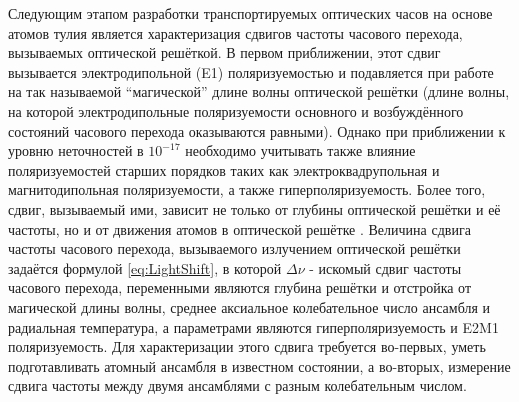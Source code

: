 Следующим этапом разработки транспортируемых оптических часов на основе атомов тулия является характеризация сдвигов частоты часового перехода, вызываемых оптической решёткой.
В первом приближении, этот сдвиг вызывается электродипольной (E1) поляризуемостью и подавляется при работе на так называемой ``магической'' длине волны оптической решётки (длине волны, на которой электродипольные поляризуемости основного и возбуждённого состояний часового перехода оказываются равными)\cite{katori2003ultrastable, katori2009magic}.
Однако при приближении к уровню неточностей в $10^{-17}$ необходимо учитывать также влияние поляризуемостей старших порядков таких как электроквадрупольная и магнитодипольная поляризуемости, а также гиперполяризуемость. 
Более того, сдвиг, вызываемый ими, зависит не только от глубины оптической решётки и её частоты, но и от движения атомов в оптической решётке \cite{ushijima2018operational}. 
Величина сдвига частоты часового перехода, вызываемого излучением оптической решётки задаётся формулой \ref{eq:LightShift}, в которой $\Delta\nu$ - искомый сдвиг частоты часового перехода, переменными являются глубина решётки и отстройка от магической длины волны, среднее аксиальное колебательное число ансамбля и радиальная температура, а параметрами являются гиперполяризуемость и E2M1 поляризуемость. 
Для характеризации этого сдвига требуется во-первых, уметь подготавливать атомный ансамбля в известном состоянии, а во-вторых, измерение сдвига частоты между двумя ансамблями с разным колебательным числом.





